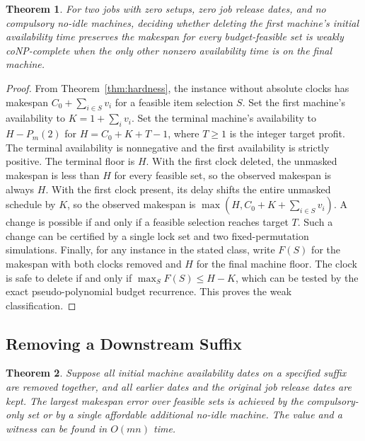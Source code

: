 \documentclass[11pt,letterpaper]{article}
\newtheorem{theorem}{Theorem}
\begin{document}
\begin{theorem}
\label{thm:deletion_hard}
For two jobs with zero setups, zero job release dates, and no compulsory no-idle machines, deciding whether deleting the first machine's initial availability time preserves the makespan for every budget-feasible set is weakly coNP-complete when the only other nonzero availability time is on the final machine.
\end{theorem}

\begin{proof}
From Theorem~\ref{thm:hardness}, the instance without absolute clocks has makespan $C_0+\sum_{i\in S}v_i$ for a feasible item selection $S$. Set the first machine's availability to $K=1+\sum_i v_i$. Set the terminal machine's availability to $H-P_m(2)$ for $H=C_0+K+T-1$, where $T\ge 1$ is the integer target profit. The terminal availability is nonnegative and the first availability is strictly positive. The terminal floor is $H$. With the first clock deleted, the unmasked makespan is less than $H$ for every feasible set, so the observed makespan is always $H$. With the first clock present, its delay shifts the entire unmasked schedule by $K$, so the observed makespan is $\max(H,C_0+K+\sum_{i\in S}v_i)$. A change is possible if and only if a feasible selection reaches target $T$. Such a change can be certified by a single lock set and two fixed-permutation simulations. Finally, for any instance in the stated class, write $F(S)$ for the makespan with both clocks removed and $H$ for the final machine floor. The clock is safe to delete if and only if $\max_S F(S)\le H-K$, which can be tested by the exact pseudo-polynomial budget recurrence. This proves the weak classification.
\end{proof}

\subsection{Removing a Downstream Suffix}

\begin{theorem}
\label{thm:suffix}
Suppose all initial machine availability dates on a specified suffix are removed together, and all earlier dates and the original job release dates are kept. The largest makespan error over feasible sets is achieved by the compulsory-only set or by a single affordable additional no-idle machine. The value and a witness can be found in $O(mn)$ time.
\end{theorem}
\end{document}
